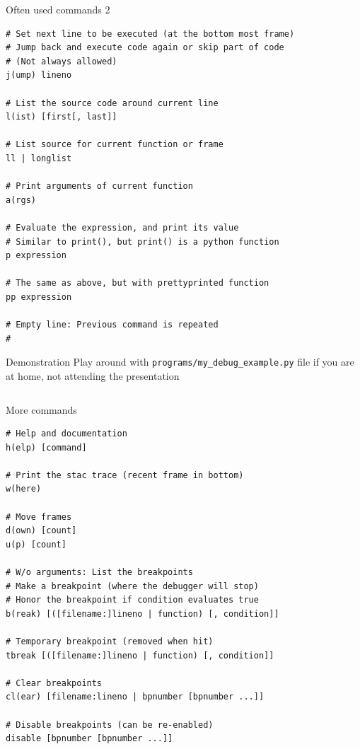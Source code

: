 \documentclass[
    size=20pt,
    style=sailor,
    display=slides,
    paper=smartboard,
    orient=landscape,
]{powerdot}
\begin{document}
\begin{slide}[method=file]{Often used commands 2}
\begin{verbatim}
# Set next line to be executed (at the bottom most frame)
# Jump back and execute code again or skip part of code
# (Not always allowed)
j(ump) lineno

# List the source code around current line
l(ist) [first[, last]]

# List source for current function or frame
ll | longlist

# Print arguments of current function
a(rgs)

# Evaluate the expression, and print its value
# Similar to print(), but print() is a python function
p expression

# The same as above, but with prettyprinted function
pp expression

# Empty line: Previous command is repeated
#
\end{verbatim}
\end{slide}



\begin{slide}[method=file]{Demonstration}
Play around with \texttt{programs/my\_debug\_example.py} file if you are at 
home, not attending the presentation
\inputminted[fontsize=\footnotesize, linenos, firstline=1, 
lastline=12]{python}{programs/my_debug_example.py}
\end{slide}


\begin{slide}[method=file]{More commands}
\begin{verbatim}
# Help and documentation
h(elp) [command]

# Print the stac trace (recent frame in bottom)
w(here)

# Move frames
d(own) [count]
u(p) [count]

# W/o arguments: List the breakpoints
# Make a breakpoint (where the debugger will stop)
# Honor the breakpoint if condition evaluates true
b(reak) [([filename:]lineno | function) [, condition]]

# Temporary breakpoint (removed when hit)
tbreak [([filename:]lineno | function) [, condition]]

# Clear breakpoints
cl(ear) [filename:lineno | bpnumber [bpnumber ...]]

# Disable breakpoints (can be re-enabled)
disable [bpnumber [bpnumber ...]]

\end{verbatim}
\end{slide}
\end{document}
